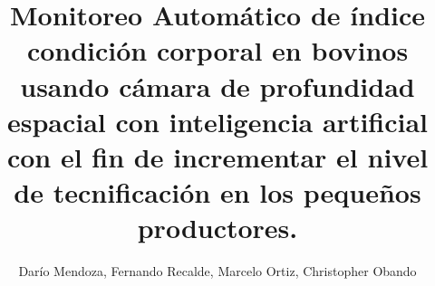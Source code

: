\documentclass[10pt,twocolumn]{article}
\begin{document}
\title{\Huge \bf Monitoreo Automático de índice condición corporal en bovinos usando cámara de profundidad espacial con inteligencia artificial con el fin de incrementar el nivel de tecnificación en los pequeños productores.}

\author{\large 
Darío Mendoza\textsuperscript{\contAutor}, Fernando Recalde\textsuperscript{\contAutor}, Marcelo Ortiz\textsuperscript{\contAutor}, Christopher Obando\textsuperscript{\contAutor}}

\maketitle
\thispagestyle{first}

\setlength{\tabcolsep}{5pt}





\printbibliography


\end{document}
